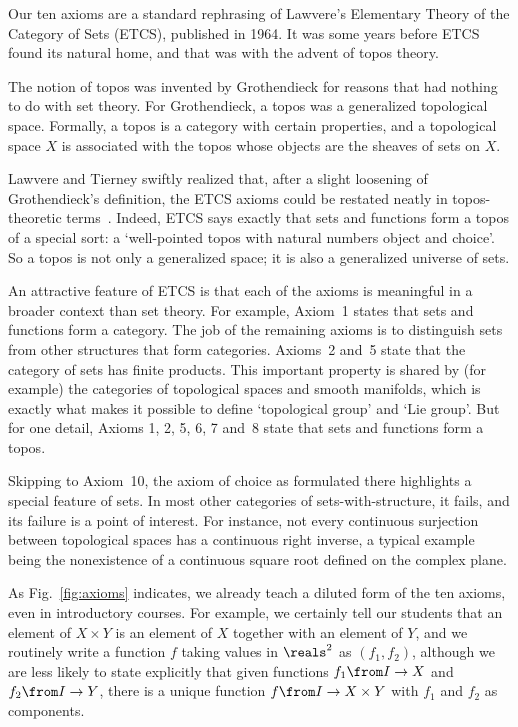 \documentclass[12pt]{article}
\begin{document}

Our ten axioms are a standard rephrasing of Lawvere's Elementary Theory of
the Category of Sets (ETCS), published in 1964.  It was some years before
ETCS found its natural home, and that was with the advent of topos theory.

The notion of topos was invented by Grothendieck for reasons that had
nothing to do with set theory.  For Grothendieck, a topos was a generalized
topological space.  Formally, a topos is a category with
certain properties, and a topological space $X$ is associated with the
topos whose objects are the sheaves of sets on $X$.  

Lawvere and Tierney swiftly realized that, after a slight loosening of
Grothendieck's definition, the ETCS axioms could be restated neatly in
topos-theoretic terms~\cite{TierSTC,TierAST}.  Indeed, ETCS says exactly
that sets and functions form a topos of a special sort: a `well-pointed
topos with natural numbers object and choice'.  So a topos is not only a
generalized space; it is also a generalized universe of sets.

An attractive feature of ETCS is that each of the axioms is meaningful in a
broader context than set theory.  For example, Axiom~1 states that sets and
functions form a category.  The job of the remaining axioms is to
distinguish sets from other structures that form categories.  Axioms~2
and~5 state that the category of sets has finite products.  This important
property is shared by (for example) the categories of topological spaces
and smooth manifolds, which is exactly what makes it possible to define
`topological group' and `Lie group'.  But for one detail, Axioms 1, 2, 5,
6, 7 and~8 state that sets and functions form a topos.

Skipping to Axiom~10, the axiom of choice as formulated there highlights a
special feature of sets.  In most other categories of sets-with-structure,
it fails, and its failure is a point of interest.  For instance, not every
continuous surjection between topological spaces has a continuous right
inverse, a typical example being the nonexistence of a continuous square
root defined on the complex plane.


As Fig.~\ref{fig:axioms} indicates, we already teach a diluted form of the
ten axioms, even in introductory courses.  For example, we certainly tell
our students that an element of $X \times Y$ is an element of $X$ together
with an element of $Y$, and we routinely write a function $f$ taking values
in $\reals^2$ as $(f_1, f_2)$, although we are less likely to state
explicitly that given functions $f_1\from I \to X$ and $f_2\from I \to Y$,
there is a unique function $f\from I \to X \times Y$ with $f_1$ and $f_2$
as components.
\end{document}
